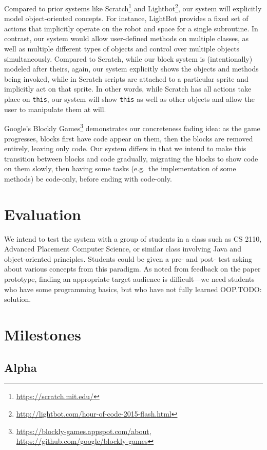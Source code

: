 \documentclass[12pt,notitlepage]{article}
\begin{document}
Compared to prior systems like
Scratch\footnote{\url{https://scratch.mit.edu/}} and
Lightbot\footnote{\url{http://lightbot.com/hour-of-code-2015-flash.html}},
our system will explicitly model object-oriented concepts. For
instance, LightBot provides a fixed set of actions that implicitly
operate on the robot and space for a single subroutine. In contrast,
our system would allow user-defined methods on multiple classes, as
well as multiple different types of objects and control over multiple
objects simultaneously. Compared to Scratch, while our block system is
(intentionally) modeled after theirs, again, our system explicitly
shows the objects and methods being invoked, while in Scratch scripts
are attached to a particular sprite and implicitly act on that
sprite. In other words, while Scratch has all actions take place on
\texttt{this}, our system will show \texttt{this} as well as other
objects and allow the user to manipulate them at will.

Google's Blockly
Games\footnote{\url{https://blockly-games.appspot.com/about},
  \url{https://github.com/google/blockly-games}} demonstrates our
concreteness fading idea: as the game progresses, blocks first have
code appear on them, then the blocks are removed entirely, leaving
only code. Our system differs in that we intend to make this
transition between blocks and code gradually, migrating the blocks to
show code on them slowly, then having some tasks (e.g.\ the
implementation of some methods) be code-only, before ending with
code-only.

\section{Evaluation}

We intend to test the system with a group of students in a class such
as CS 2110, Advanced Placement Computer Science, or similar class
involving Java and object-oriented principles. Students could be given
a pre- and post- test asking about various concepts from this
paradigm. As noted from feedback on the paper prototype, finding an
appropriate target audience is difficult---we need students who have
some programming basics, but who have not fully learned OOP.\@ TODO:
solution.

\section{Milestones}

\subsection{Alpha}
\end{document}
